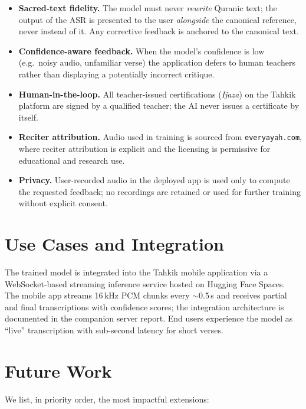\begin{itemize}
  \item \textbf{Sacred-text fidelity.} The model must never \emph{rewrite}
        Quranic text; the output of the ASR is presented to the user
        \emph{alongside} the canonical reference, never instead of it.
        Any corrective feedback is anchored to the canonical text.
  \item \textbf{Confidence-aware feedback.} When the model's confidence
        is low (e.g.\ noisy audio, unfamiliar verse) the application
        defers to human teachers rather than displaying a potentially
        incorrect critique.
  \item \textbf{Human-in-the-loop.} All teacher-issued certifications
        (\textit{Ijaza}) on the Tahkik platform are signed by a
        qualified teacher; the AI never issues a certificate by itself.
  \item \textbf{Reciter attribution.} Audio used in training is sourced
        from \texttt{everyayah.com}, where reciter attribution is
        explicit and the licensing is permissive for educational and
        research use.
  \item \textbf{Privacy.} User-recorded audio in the deployed app is
        used only to compute the requested feedback; no recordings are
        retained or used for further training without explicit consent.
\end{itemize}

\section{Use Cases and Integration}

The trained model is integrated into the Tahkik mobile application via a
WebSocket-based streaming inference service hosted on Hugging Face
Spaces. The mobile app streams 16\,kHz PCM chunks every $\sim$0.5\,s
and receives partial and final transcriptions with confidence scores;
the integration architecture is documented in the companion server
report. End users experience the model as ``live'' transcription with
sub-second latency for short verses.

\section{Future Work}

We list, in priority order, the most impactful extensions:

